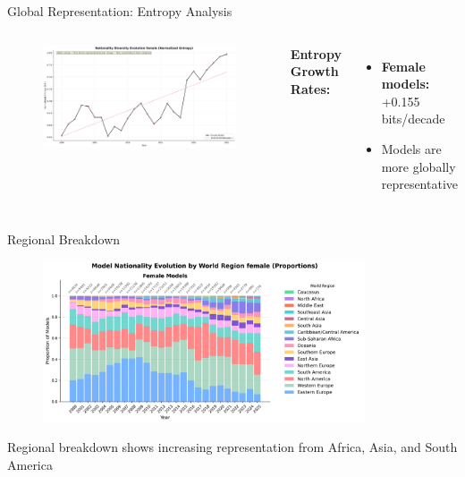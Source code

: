 \documentclass[aspectratio=169,xcolor=dvipsnames,10pt]{beamer}
\begin{document}
\begin{frame}{Global Representation: Entropy Analysis}
    \begin{columns}[c]
        \begin{figure}
            \includegraphics[width=\textwidth]{figures/nationality_entropy_evolution_female.png}
        \end{figure}
        
        \textbf{Entropy Growth Rates:}
        \begin{itemize}
            \item \textbf{Female models:} +0.155 bits/decade
            \item Models are more globally representative
        \end{itemize}
        
    \end{columns}
\end{frame}

\begin{frame}{Regional Breakdown}
    \begin{figure}
        \centering
        \includegraphics[width=0.85\textwidth]{figures/nationality_evolution_by_region_female.png}
    \end{figure}
    \vspace{-1.5em}
    \begin{block}{}
    Regional breakdown shows increasing representation from Africa, Asia, and South America
    \end{block}
\end{frame}
\end{document}
